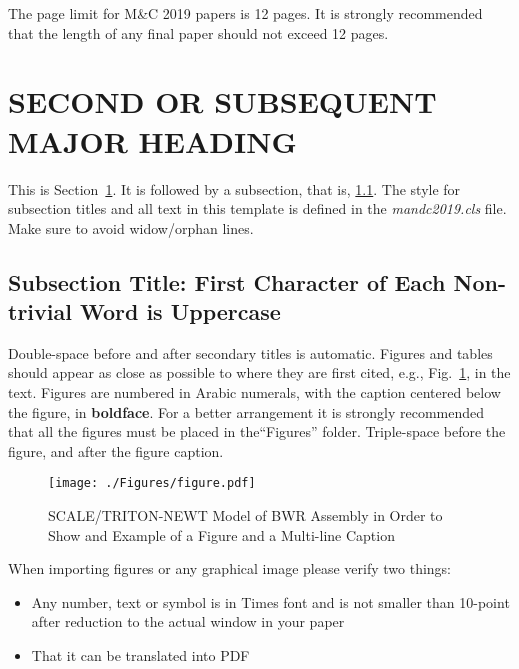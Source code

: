 \documentclass[letterpaper]{mandc2019}
\begin{document}
The page limit for M\&C 2019 papers is 12 pages. It is strongly recommended that 
the length of any final paper should not exceed 12 pages.

\section{SECOND OR SUBSEQUENT MAJOR HEADING} 
\label{sec:first}

This is Section~\ref{sec:first}. It is followed by a subsection, that is, 
\ref{sec:second}. The style for subsection titles and all text in this template is defined 
in the \emph{mandc2019.cls} file.  Make sure to avoid widow/orphan lines.

\subsection{Subsection Title: First Character of Each Non-trivial Word is Uppercase} 
\label{sec:second}

Double-space before and after secondary titles is automatic.  Figures and 
tables should appear as close as possible to where they are first
cited, e.g., Fig.~\ref{fig:amdahl}, in the text.  Figures are numbered in Arabic 
numerals, with the caption centered below the figure, in \textbf{boldface}. For a better 
arrangement it is strongly recommended that all the figures must be placed in the``Figures'' 
folder. Triple-space before the figure, and after the figure caption.

\begin{figure}[!htb]
  \centering
  \texttt{[image: ./Figures/figure.pdf]}
  \caption{SCALE/TRITON-NEWT Model of BWR Assembly in Order to Show and Example of a Figure and a Multi-line Caption}   
  \label{fig:amdahl}
\end{figure}

When importing figures or any graphical image please verify two things:
\vspace{-0.65cm} %
\begin{itemize} \itemsep1pt \parskip0pt 
\item Any number, text or symbol is in Times font and is not smaller than 
  10-point after reduction to the actual window in your paper
\item That it can be translated into PDF
\end{itemize}
\end{document}
